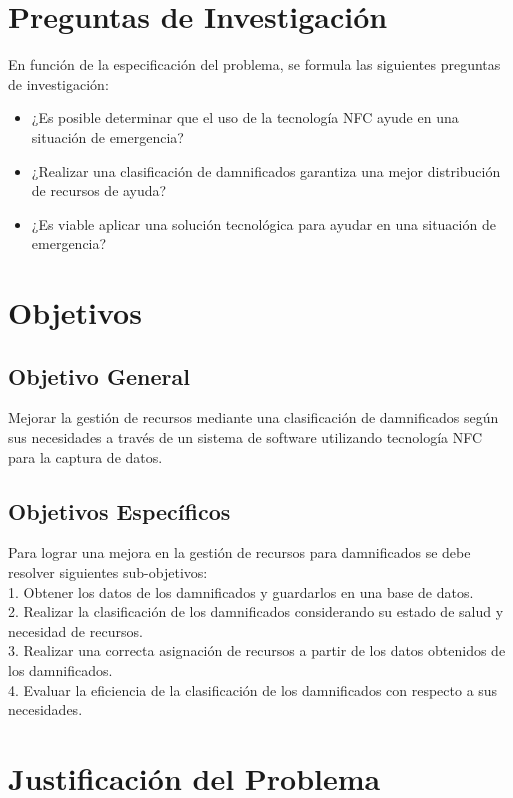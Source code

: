 \documentclass[11pt,openany]{book}
\newcounter{ns}
\begin{document}
	\section{Preguntas de Investigación}

	En función de la especificación del problema, se formula las siguientes preguntas de investigación:

	\begin{itemize}
		\item ¿Es posible determinar que el uso de la tecnología NFC ayude en una situación de emergencia?
		\item ¿Realizar una clasificación de damnificados garantiza una mejor distribución de recursos de ayuda?
		\item ¿Es viable aplicar una solución tecnológica para ayudar en una situación de emergencia?
	\end{itemize}
	\section{Objetivos}

	\subsection{Objetivo General}
	Mejorar la gestión de recursos mediante una clasificación de damnificados según sus necesidades a través de un sistema de software utilizando tecnología NFC para la captura de datos.
	\subsection{Objetivos Específicos}
	Para lograr una mejora en la gestión de recursos para damnificados se debe resolver siguientes sub-objetivos:\\
	1. Obtener los datos de los damnificados y guardarlos en una base de datos.\\
	2. Realizar la clasificación de los damnificados considerando su estado de salud y necesidad de recursos.\\
	3. Realizar una correcta asignación de recursos a partir de los datos obtenidos de los damnificados.\\
	4. Evaluar la eficiencia de la clasificación de los damnificados con respecto a sus necesidades.\\

	\section{Justificación del Problema}
\end{document}
